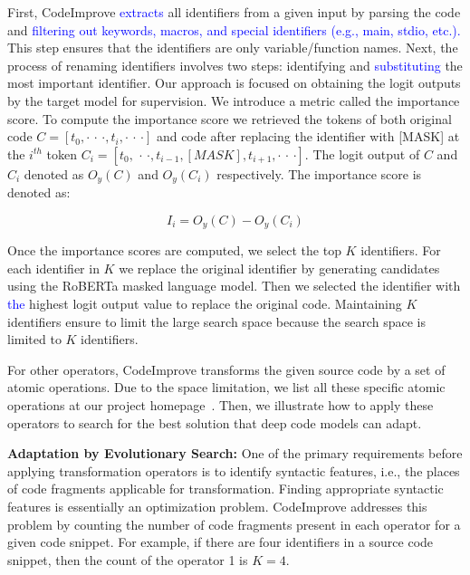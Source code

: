 First, CodeImprove \textcolor{blue}{extracts} all identifiers from a given input by parsing the code and \textcolor{blue}{filtering out keywords, macros, and special identifiers (e.g., main, stdio, etc.).}
This step ensures that the identifiers are only variable/function names. Next, the process of renaming identifiers involves two steps: identifying and \textcolor{blue}{substituting} the most important identifier. Our approach is focused on obtaining the logit outputs by the target model for supervision. %
We introduce a metric called the importance score.
To compute the importance score we retrieved the tokens of both original code $C = [t_0, \text{· · ·} , t_i,
\text{· · ·} ]$ and code after replacing the identifier with [MASK] at the $i^{th}$ token
 $C_i =[t_0,\text{ · ·} ,t_{i-1} , [MASK], t_{i+1}, \text{· · ·} ] $. The logit output of $C$ and $C_i$ denoted as $O_y(C)$ and $O_y(C_i)$ respectively. The importance score is denoted as: 
 
\begin{equation} \label{eq:idenscore}
    I_i = O_y(C) - O_y(C_i)
\end{equation}

Once the importance scores are computed, we select the top $K$ identifiers. For each identifier in $K$ we replace the original identifier by generating candidates using the RoBERTa masked language model. Then we selected the identifier with \textcolor{blue}{the} highest logit output value to replace the original code. Maintaining $K$ identifiers ensure to limit the large search space because the search space is limited to $K$ identifiers. %

For other operators, CodeImprove transforms the given source code by a set of atomic operations. Due to the
space limitation, we list all these specific atomic operations at our project homepage~\cite{CodeImprove}. Then, we illustrate how to apply these operators to search for the best solution that deep code models can adapt.

\textbf{Adaptation by Evolutionary Search:}
One of the primary requirements before applying transformation operators is to identify syntactic features, i.e., the places of code fragments applicable for transformation. Finding appropriate syntactic features is essentially an optimization problem. CodeImprove addresses this problem by counting the number of code fragments present in each operator for a given code snippet. For example, if there are four identifiers in a source code snippet, then the count of the operator 1 is $K = 4$. 

